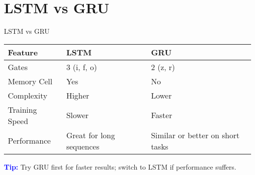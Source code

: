 \section{LSTM vs GRU}
\begin{frame}{LSTM vs GRU}
    \begin{table}[]
        \centering
        \begin{tabular}{|l|l|l|}
            \hline
            \textbf{Feature}        & \textbf{LSTM}                     & \textbf{GRU}                              \\ \hline
            Gates                   & 3 (i, f, o)                        & 2 (z, r)                                  \\ \hline
            Memory Cell             & Yes                                & No                                        \\ \hline
            Complexity              & Higher                             & Lower                                     \\ \hline
            Training Speed          & Slower                             & Faster                                    \\ \hline
            Performance             & Great for long sequences           & Similar or better on short tasks          \\ \hline
        \end{tabular}
    \end{table}

    \vspace{1em}
    \textbf{\textcolor{blue}{\faLightbulbO\enspace Tip:}} Try GRU first for faster results; switch to LSTM if performance suffers.
\end{frame}


